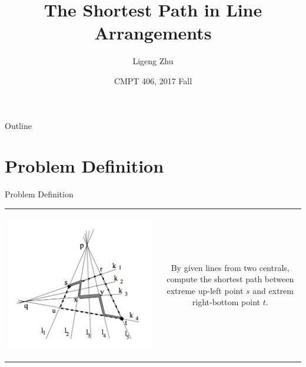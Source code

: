 \documentclass{beamer}
\title{The Shortest Path in Line Arrangements}
\author{Ligeng Zhu\inst{1} }
\institute[Simon Farser University] %
{
  \inst{1}%
  Department of Computing Science\\
  Simon Fraser University
}
\date{CMPT 406, 2017 Fall}
\begin{document}
\begin{frame}
  \titlepage
\end{frame}

\begin{frame}{Outline}
  \tableofcontents
\end{frame}

\section{Problem Definition}

\begin{frame}{Problem Definition}{}
    \begin{tabular}{c c}
        \begin{minipage}{0.4\textwidth}
            \begin{center}
                \includegraphics[width=\linewidth]{problem_definition.png}
            \end{center}
        \end{minipage}  
        &  
        \begin{minipage}{0.5\textwidth}
            By given lines from two centrals, compute the shortest path between extreme up-left point $s$ and extrem right-bottom point $t$. 
        \end{minipage} 
    \end{tabular}
  
\end{frame}
\end{document}
